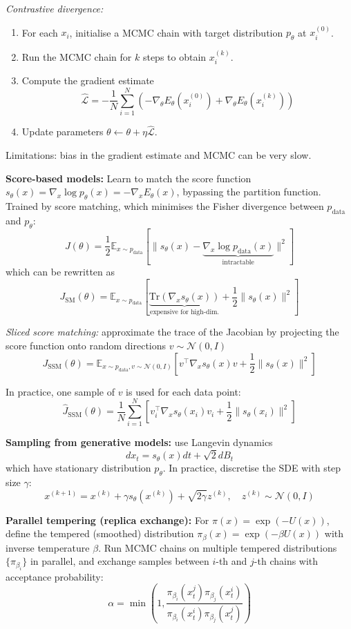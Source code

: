 \documentclass[12pt]{article}
\begin{document}
\textit{Contrastive divergence:}
\begin{enumerate}
    \item For each $x_i$, initialise a MCMC chain with target distribution $p_\theta$ at $x_i^{(0)}$.
    \item Run the MCMC chain for $k$ steps to obtain $x_i^{(k)}$.
    \item Compute the gradient estimate
    $$
    \hat{\mathcal{L}} = - \frac{1}{N} \sum_{i=1}^N \left( -\nabla_\theta E_\theta(x_i^{(0)}) + \nabla_\theta E_\theta(x_i^{(k)}) \right)
    $$
    \item Update parameters $\theta \leftarrow \theta + \eta \hat{\mathcal{L}}$.
\end{enumerate}
Limitations: bias in the gradient estimate and MCMC can be very slow.

\textbf{Score-based models:} Learn to match the score function $s_\theta(x) = \nabla_x \log p_\theta(x) = -\nabla_x E_\theta(x)$, bypassing the partition function.
Trained by score matching, which minimises the Fisher divergence between $p_\text{data}$ and $p_\theta$:
$$
J(\theta) = \frac{1}{2} \mathbb{E}_{x \sim p_\text{data}}\left[\|s_\theta(x) - \underbrace{\nabla_x \log p_\text{data}(x)}_{\text{intractable}}\|^2\right]
$$
which can be rewritten as
$$
J_\text{SM}(\theta) = \mathbb{E}_{x \sim p_\text{data}}\left[\underbrace{\text{Tr}(\nabla_x s_\theta(x))}_{\text{expensive for high-dim.}} + \frac{1}{2} \|s_\theta(x)\|^2\right]
$$

\textit{Sliced score matching:} approximate the trace of the Jacobian by projecting the score function onto random directions $v \sim \mathcal{N}(0, I)$
$$
J_\text{SSM}(\theta) = \mathbb{E}_{x \sim p_\text{data}, v \sim \mathcal{N}(0, I)}\left[v^\top \nabla_x s_\theta(x) v + \frac{1}{2} \|s_\theta(x)\|^2\right]
$$

In practice, one sample of $v$ is used for each data point:
$$
\hat{J}_\text{SSM}(\theta) = \frac{1}{N} \sum_{i=1}^N \left[v_i^\top \nabla_x s_\theta(x_i) v_i + \frac{1}{2} \|s_\theta(x_i)\|^2\right]
$$

\textbf{Sampling from generative models:} use Langevin dynamics
$$
dx_t = s_\theta(x) dt + \sqrt{2} dB_t
$$
which have stationary distribution $p_\theta$. In practice, discretise the SDE with step size $\gamma$:
$$
x^{(k+1)} = x^{(k)} + \gamma s_\theta(x^{(k)}) + \sqrt{2\gamma} z^{(k)}, \quad z^{(k)} \sim \mathcal{N}(0, I)
$$

\textbf{Parallel tempering (replica exchange):} For $\pi(x) = \exp(-U(x))$, define the tempered (smoothed) distribution $\pi_\beta(x) = \exp(-\beta U(x))$ with inverse temperature $\beta$. 
Run MCMC chains on multiple tempered distributions $\{\pi_{\beta_i}\}$ in parallel, and exchange samples between $i$-th and $j$-th chains with acceptance probability:
$$
\alpha = \min\left(1, \frac{\pi_{\beta_i}(x_t^j) \pi_{\beta_j}(x_t^i)}{\pi_{\beta_i}(x_t^i) \pi_{\beta_j}(x_t^j)}\right)
$$
\end{document}
